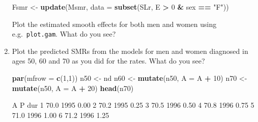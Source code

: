 \documentclass[
]{book}
\newenvironment{Shaded}{\begin{snugshade}}{\end{snugshade}}
\newcommand{\AttributeTok}[1]{\textcolor[rgb]{0.13,0.29,0.53}{#1}}
\newcommand{\DecValTok}[1]{\textcolor[rgb]{0.00,0.00,0.81}{#1}}
\newcommand{\FunctionTok}[1]{\textcolor[rgb]{0.13,0.29,0.53}{\textbf{#1}}}
\newcommand{\NormalTok}[1]{#1}
\newcommand{\OtherTok}[1]{\textcolor[rgb]{0.56,0.35,0.01}{#1}}
\newcommand{\SpecialCharTok}[1]{\textcolor[rgb]{0.81,0.36,0.00}{\textbf{#1}}}
\newcommand{\StringTok}[1]{\textcolor[rgb]{0.31,0.60,0.02}{#1}}
\begin{document}
\begin{enumerate}
\begin{Shaded}
\begin{Highlighting}[]
\NormalTok{Fsmr }\OtherTok{\textless{}{-}} \FunctionTok{update}\NormalTok{(Msmr, }\AttributeTok{data =} \FunctionTok{subset}\NormalTok{(SLr, E }\SpecialCharTok{\textgreater{}} \DecValTok{0} \SpecialCharTok{\&}\NormalTok{ sex }\SpecialCharTok{==} \StringTok{"F"}\NormalTok{))}
\end{Highlighting}
\end{Shaded}

  Plot the estimated smooth effects for both men and women using
  e.g.~\texttt{plot.gam}. What do you see?
\item
  Plot the predicted SMRs from the models for men and women
  diagnosed in ages 50, 60 and 70 as you did for the rates. What do
  you see?

\begin{Shaded}
\begin{Highlighting}[]
\FunctionTok{par}\NormalTok{(}\AttributeTok{mfrow =} \FunctionTok{c}\NormalTok{(}\DecValTok{1}\NormalTok{,}\DecValTok{1}\NormalTok{))}
\NormalTok{n50 }\OtherTok{\textless{}{-}}\NormalTok{ nd}
\NormalTok{n60 }\OtherTok{\textless{}{-}} \FunctionTok{mutate}\NormalTok{(n50, }\AttributeTok{A =}\NormalTok{ A }\SpecialCharTok{+} \DecValTok{10}\NormalTok{)}
\NormalTok{n70 }\OtherTok{\textless{}{-}} \FunctionTok{mutate}\NormalTok{(n50, }\AttributeTok{A =}\NormalTok{ A }\SpecialCharTok{+} \DecValTok{20}\NormalTok{)}
\FunctionTok{head}\NormalTok{(n70)}
\end{Highlighting}
\end{Shaded}

\begin{Shaded}
\begin{Highlighting}[]
\NormalTok{     A    P  dur}
\NormalTok{1 70.0 1995 0.00}
\NormalTok{2 70.2 1995 0.25}
\NormalTok{3 70.5 1996 0.50}
\NormalTok{4 70.8 1996 0.75}
\NormalTok{5 71.0 1996 1.00}
\NormalTok{6 71.2 1996 1.25}
\end{Highlighting}
\end{Shaded}


\end{enumerate}
\end{document}
